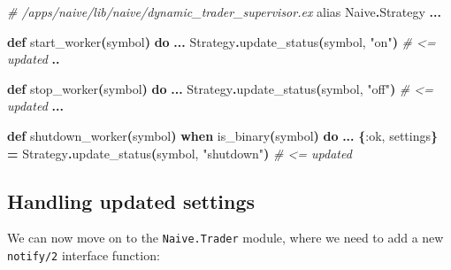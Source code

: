 \documentclass[
  oneside]{book}
\newenvironment{Shaded}{\begin{snugshade}}{\end{snugshade}}
\newcommand{\CommentTok}[1]{\textcolor[rgb]{0.56,0.35,0.01}{\textit{#1}}}
\newcommand{\ConstantTok}[1]{\textcolor[rgb]{0.56,0.35,0.01}{#1}}
\newcommand{\FunctionTok}[1]{\textcolor[rgb]{0.13,0.29,0.53}{\textbf{#1}}}
\newcommand{\ImportTok}[1]{#1}
\newcommand{\KeywordTok}[1]{\textcolor[rgb]{0.13,0.29,0.53}{\textbf{#1}}}
\newcommand{\NormalTok}[1]{#1}
\newcommand{\OperatorTok}[1]{\textcolor[rgb]{0.81,0.36,0.00}{\textbf{#1}}}
\newcommand{\StringTok}[1]{\textcolor[rgb]{0.31,0.60,0.02}{#1}}
\newcommand{\VariableTok}[1]{\textcolor[rgb]{0.00,0.00,0.00}{#1}}
\begin{document}
\begin{Shaded}
\begin{Highlighting}[]
  \CommentTok{\# /apps/naive/lib/naive/dynamic\_trader\_supervisor.ex}
  \ImportTok{alias} \ConstantTok{Naive}\OperatorTok{.}\ConstantTok{Strategy}
  \OperatorTok{...}

  \KeywordTok{def}\NormalTok{ start\_worker}\FunctionTok{(}\NormalTok{symbol}\FunctionTok{)} \KeywordTok{do}
    \OperatorTok{...}
    \ConstantTok{Strategy}\OperatorTok{.}\NormalTok{update\_status}\FunctionTok{(}\NormalTok{symbol, }\StringTok{"on"}\FunctionTok{)} \CommentTok{\# \textless{}= updated}
    \OperatorTok{..}

  \KeywordTok{def}\NormalTok{ stop\_worker}\FunctionTok{(}\NormalTok{symbol}\FunctionTok{)} \KeywordTok{do}
    \OperatorTok{...}
    \ConstantTok{Strategy}\OperatorTok{.}\NormalTok{update\_status}\FunctionTok{(}\NormalTok{symbol, }\StringTok{"off"}\FunctionTok{)} \CommentTok{\# \textless{}= updated}
    \OperatorTok{...}

  \KeywordTok{def}\NormalTok{ shutdown\_worker}\FunctionTok{(}\NormalTok{symbol}\FunctionTok{)} \KeywordTok{when}\NormalTok{ is\_binary}\FunctionTok{(}\NormalTok{symbol}\FunctionTok{)} \KeywordTok{do}
    \OperatorTok{...}
    \FunctionTok{\{}\VariableTok{:ok}\NormalTok{, settings}\FunctionTok{\}} \OperatorTok{=} \ConstantTok{Strategy}\OperatorTok{.}\NormalTok{update\_status}\FunctionTok{(}\NormalTok{symbol, }\StringTok{"shutdown"}\FunctionTok{)} \CommentTok{\# \textless{}= updated}
\end{Highlighting}
\end{Shaded}

\subsection{Handling updated settings}\label{handling-updated-settings}

We can now move on to the \texttt{Naive.Trader} module, where we need to add a new \texttt{notify/2} interface function:
\end{document}
